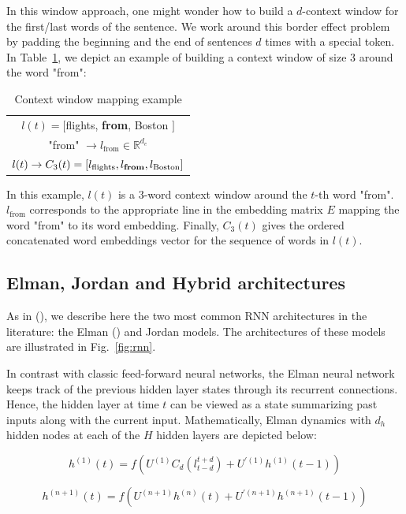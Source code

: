 In this window approach, one might wonder how to build a $d$-context window for
the first/last words of the sentence. We work around this border effect problem
by padding the beginning and the end of sentences $d$ times with a special token.
In Table~\ref{fig:cwmap}, we depict an example of building a context window of size $3$ around the
word "from":

\begin{table}
\centering
\begin{tabular}{c}
$l(t)=[$flights, {\bf from}, Boston $]$ \\
"from" $\rightarrow l_{\textrm{from}}\in\mathbb{R}^{d_e}$ \\
$l(t)\rightarrow C_{3}(t)=[l_{\textrm{flights}}, l_{\textrm{{\bf from}}}, l_{\textrm{Boston}}]$
\end{tabular}
\caption{
\label{fig:cwmap}
Context window mapping example}
\end{table}

In this example, $l(t)$ is a $3$-word context window around the $t$-th word
"from".  $l_{\textrm{from}}$ corresponds to the appropriate line in the
embedding matrix $E$ mapping the word "from" to its word embedding. Finally,
$C_3 (t)$ gives the ordered concatenated word embeddings vector for the
sequence of words in $l(t)$.

\subsection{Elman, Jordan and Hybrid architectures}

As in (\cite{rnn15}), we describe here the two most common RNN architectures in the
literature: the Elman (\cite{rnn16}) and Jordan \citep{rnn17} models. The architectures of these
models are illustrated in Fig.~\ref{fig:rnn}.

In contrast with classic feed-forward neural networks, the Elman neural network
keeps track of the previous hidden layer states through its recurrent
connections. Hence, the hidden layer at time $t$ can be viewed as a state
summarizing past inputs along with the current input. Mathematically, Elman
dynamics with $d_h$ hidden nodes at each of the $H$ hidden layers are depicted
below:

\begin{equation}
h^{(1)}(t) = f(U^{(1)}C_{d}(l_{t-d}^{t+d})+U^{'(1)}h^{(1)}(t-1))
\end{equation}

\begin{equation}
h^{(n+1)}(t) = f(U^{(n+1)}h^{(n)}(t) + U^{'(n+1)}h^{(n+1)}(t-1))
\end{equation}


